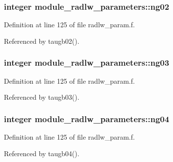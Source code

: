 \subsubsection[{\texorpdfstring{ng02}{ng02}}]{\setlength{\rightskip}{0pt plus 5cm}integer module\+\_\+radlw\+\_\+parameters\+::ng02}\hypertarget{namespacemodule__radlw__parameters_aed66d66a4da744d27c13b57b41ba78c3}{}\label{namespacemodule__radlw__parameters_aed66d66a4da744d27c13b57b41ba78c3}


Definition at line 125 of file radlw\+\_\+param.\+f.



Referenced by taugb02().

\subsubsection[{\texorpdfstring{ng03}{ng03}}]{\setlength{\rightskip}{0pt plus 5cm}integer module\+\_\+radlw\+\_\+parameters\+::ng03}\hypertarget{namespacemodule__radlw__parameters_ad226d9951e041e991f463a9a90e7f68b}{}\label{namespacemodule__radlw__parameters_ad226d9951e041e991f463a9a90e7f68b}


Definition at line 125 of file radlw\+\_\+param.\+f.



Referenced by taugb03().

\subsubsection[{\texorpdfstring{ng04}{ng04}}]{\setlength{\rightskip}{0pt plus 5cm}integer module\+\_\+radlw\+\_\+parameters\+::ng04}\hypertarget{namespacemodule__radlw__parameters_afd05a94bc29e5a5d792c0c140fe3a0c4}{}\label{namespacemodule__radlw__parameters_afd05a94bc29e5a5d792c0c140fe3a0c4}


Definition at line 125 of file radlw\+\_\+param.\+f.



Referenced by taugb04().

